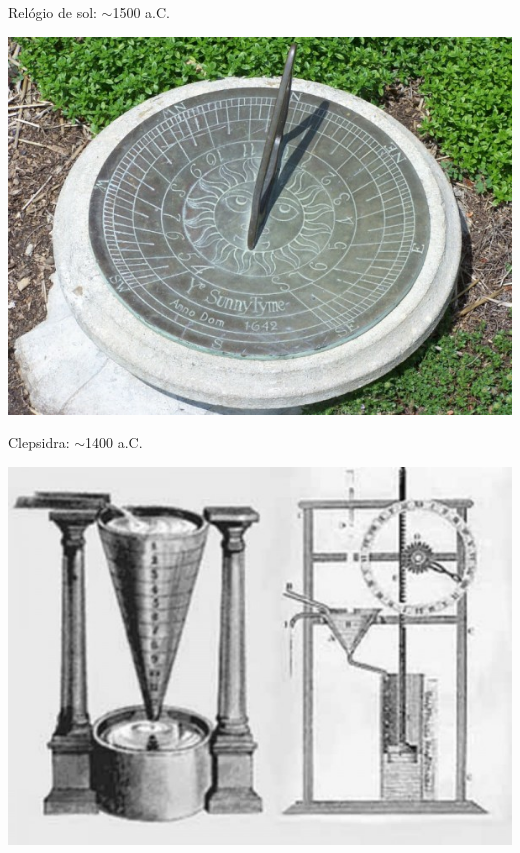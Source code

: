 \begin{multicols}{2}
	
	Relógio de sol: $\sim$1500 a.C.
	\begin{center}
		\includegraphics[width=\linewidth]{./IMG/Tempo-Relogio-de-Sol-600x450.jpg}
	\end{center}

\vfill\null
\columnbreak

Clepsidra: $\sim$1400 a.C.
	\begin{center}
	\includegraphics[width=\linewidth]{./IMG/Tempo-Clepsidra-600x450.jpg}
\end{center}

\vfill
\pagebreak
\end{multicols}

